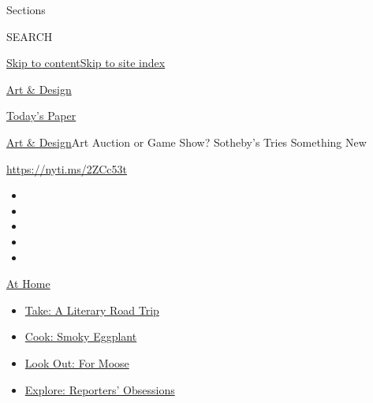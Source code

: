 Sections

SEARCH

\protect\hyperlink{site-content}{Skip to
content}\protect\hyperlink{site-index}{Skip to site index}

\href{https://www.nytimes3xbfgragh.onion/section/arts/design}{Art \&
Design}

\href{https://myaccount.nytimes3xbfgragh.onion/auth/login?response_type=cookie\&client_id=vi}{}

\href{https://www.nytimes3xbfgragh.onion/section/todayspaper}{Today's
Paper}

\href{/section/arts/design}{Art \& Design}\textbar{}Art Auction or Game
Show? Sotheby's Tries Something New

\url{https://nyti.ms/2ZCc53t}

\begin{itemize}
\item
\item
\item
\item
\item
\end{itemize}

\href{https://www.nytimes3xbfgragh.onion/spotlight/at-home?action=click\&pgtype=Article\&state=default\&region=TOP_BANNER\&context=at_home_menu}{At
Home}

\begin{itemize}
\tightlist
\item
  \href{https://www.nytimes3xbfgragh.onion/2020/07/28/books/time-for-a-literary-road-trip.html?action=click\&pgtype=Article\&state=default\&region=TOP_BANNER\&context=at_home_menu}{Take:
  A Literary Road Trip}
\item
  \href{https://www.nytimes3xbfgragh.onion/2020/07/29/magazine/bored-with-your-home-cooking-some-smoky-eggplant-will-fix-that.html?action=click\&pgtype=Article\&state=default\&region=TOP_BANNER\&context=at_home_menu}{Cook:
  Smoky Eggplant}
\item
  \href{https://www.nytimes3xbfgragh.onion/2020/07/27/travel/moose-michigan-isle-royale.html?action=click\&pgtype=Article\&state=default\&region=TOP_BANNER\&context=at_home_menu}{Look
  Out: For Moose}
\item
  \href{https://www.nytimes3xbfgragh.onion/interactive/2020/at-home/even-more-reporters-editors-diaries-lists-recommendations.html?action=click\&pgtype=Article\&state=default\&region=TOP_BANNER\&context=at_home_menu}{Explore:
  Reporters' Obsessions}
\end{itemize}

